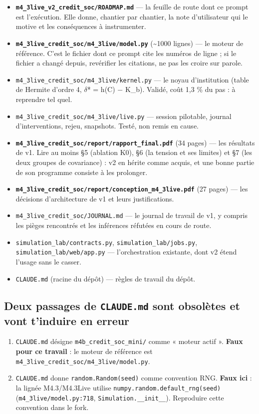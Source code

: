 \documentclass[11pt,a4paper]{article}
\newcommand{\code}[1]{\texttt{#1}}
\begin{document}
\begin{itemize}
\item \textbf{\code{m4\_3live\_v2\_credit\_soc/ROADMAP.md}} --- la feuille de route dont ce prompt est l'exécution. Elle donne, chantier par chantier, la note d'utilisateur qui le motive et les conséquences à instrumenter.
\item \textbf{\code{m4\_3live\_credit\_soc/m4\_3live/model.py}} (\textasciitilde{}1000 lignes) --- le moteur de référence. C'est le fichier dont ce prompt cite les numéros de ligne ; si le fichier a changé depuis, revérifier les citations, ne pas les croire sur parole.
\item \code{m4\_3live\_credit\_soc/m4\_3live/kernel.py} --- le noyau d'institution (table de Hermite d'ordre 4, \ensuremath{\delta}* = h(C) \ensuremath{-} K\_b). Validé, coût 1,3 \% du pas : à reprendre tel quel.
\item \code{m4\_3live\_credit\_soc/m4\_3live/live.py} --- session pilotable, journal d'interventions, rejeu, snapshots. Testé, non remis en cause.
\item \textbf{\code{m4\_3live\_credit\_soc/report/rapport\_final.pdf}} (34 pages) --- les résultats de v1. Lire au moins §5 (ablation K0), §6 (la tension et ses limites) et §7 (les deux groupes de covariance) : v2 en hérite comme acquis, et une bonne partie de son programme consiste à les prolonger.
\item \textbf{\code{m4\_3live\_credit\_soc/report/conception\_m4\_3live.pdf}} (27 pages) --- les décisions d'architecture de v1 et leurs justifications.
\item \code{m4\_3live\_credit\_soc/JOURNAL.md} --- le journal de travail de v1, y compris les pièges rencontrés et les inférences réfutées en cours de route.
\item \code{simulation\_lab/contracts.py}, \code{simulation\_lab/jobs.py}, \code{simulation\_lab/web/app.py} --- l'orchestration existante, dont v2 étend l'usage sans le casser.
\item \code{CLAUDE.md} (racine du dépôt) --- règles de travail du dépôt.
\end{itemize}

\subsection*{Deux passages de \code{CLAUDE.md} sont obsolètes et vont t'induire en erreur}

\begin{enumerate}
\item \code{CLAUDE.md} désigne \code{m4b\_credit\_soc\_mini/} comme « moteur actif ». \textbf{Faux pour ce travail} : le moteur de référence est \code{m4\_3live\_credit\_soc/m4\_3live/model.py}.
\item \code{CLAUDE.md} donne \code{random.Random(seed)} comme convention RNG. \textbf{Faux ici} : la lignée M4.3/M4.3Live utilise \code{numpy.random.default\_rng(seed)} (\code{m4\_3live/model.py:718}, \code{Simulation.\_\_init\_\_}). Reproduire cette convention dans le fork.
\end{enumerate}
\end{document}
